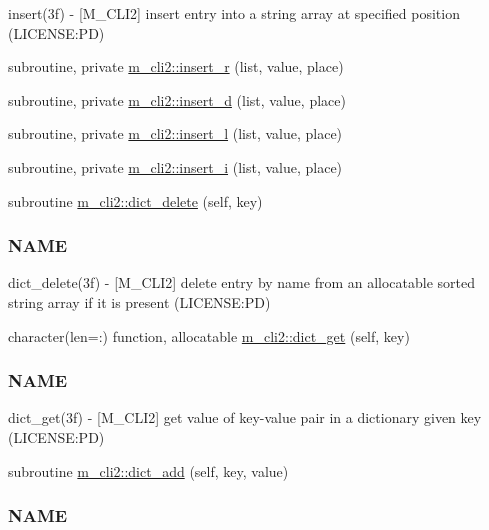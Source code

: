 \begin{DoxyCompactItemize}
\begin{DoxyCompactList}
insert(3f) -\/ \mbox{[}M\+\_\+\+C\+L\+I2\mbox{]} insert entry into a string array at specified position (L\+I\+C\+E\+N\+SE\+:PD) \end{DoxyCompactList}\item 
subroutine, private \mbox{\hyperlink{namespacem__cli2_ae43e655d3678fcc31824a3e9db3daae1}{m\+\_\+cli2\+::insert\+\_\+r}} (list, value, place)
\item 
subroutine, private \mbox{\hyperlink{namespacem__cli2_a737ae8e6f73a3fc8cc260732c047fafb}{m\+\_\+cli2\+::insert\+\_\+d}} (list, value, place)
\item 
subroutine, private \mbox{\hyperlink{namespacem__cli2_a7e5ee66813d8f6db9d48ebdc350a6b3e}{m\+\_\+cli2\+::insert\+\_\+l}} (list, value, place)
\item 
subroutine, private \mbox{\hyperlink{namespacem__cli2_afa6f00a57f1252ba5daa0c440a23ffbb}{m\+\_\+cli2\+::insert\+\_\+i}} (list, value, place)
\item 
subroutine \mbox{\hyperlink{namespacem__cli2_afcdd2c59305faf341ebf8ec3b115a05e}{m\+\_\+cli2\+::dict\+\_\+delete}} (self, key)
\begin{DoxyCompactList}\small\item\em \subsubsection*{N\+A\+ME}

dict\+\_\+delete(3f) -\/ \mbox{[}M\+\_\+\+C\+L\+I2\mbox{]} delete entry by name from an allocatable sorted string array if it is present (L\+I\+C\+E\+N\+SE\+:PD) \end{DoxyCompactList}\item 
character(len=\+:) function, allocatable \mbox{\hyperlink{namespacem__cli2_a5b489c992f1434fa27e7858a483a38c7}{m\+\_\+cli2\+::dict\+\_\+get}} (self, key)
\begin{DoxyCompactList}\small\item\em \subsubsection*{N\+A\+ME}

dict\+\_\+get(3f) -\/ \mbox{[}M\+\_\+\+C\+L\+I2\mbox{]} get value of key-\/value pair in a dictionary given key (L\+I\+C\+E\+N\+SE\+:PD) \end{DoxyCompactList}\item 
subroutine \mbox{\hyperlink{namespacem__cli2_a601a06b7038b524abababc8d437ee823}{m\+\_\+cli2\+::dict\+\_\+add}} (self, key, value)
\begin{DoxyCompactList}\small\item\em \subsubsection*{N\+A\+ME}


\end{DoxyCompactList}
\end{DoxyCompactItemize}
